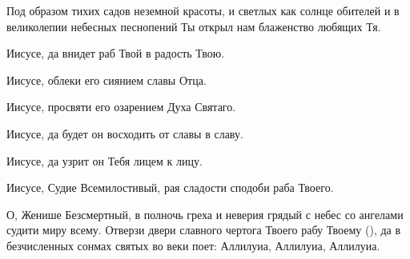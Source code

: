 \begin{mymulticols}

Под образом тихих садов неземной красоты, и светлых как солнце обителей и в великолепии небесных песнопений Ты открыл нам блаженство любящих Тя. 

Иисусе, да внидет раб Твой в радость Твою. 

Иисусе, облеки его сиянием славы Отца. 

Иисусе, просвяти его озарением Духа Святаго. 

Иисусе, да будет он восходить от славы в славу. 

Иисусе, да узрит он Тебя лицем к лицу. 

Иисусе, Судие Всемилостивый, рая сладости сподоби раба Твоего.


О, Женише Безсмертный, в полночь греха и неверия грядый с небес со ангелами судити миру всему. Отверзи двери славного чертога Твоего рабу Твоему (), да в безчисленных сонмах святых во веки поет: Аллилуиа, Аллилуиа, Аллилуиа. 


\akafistZaEdinIkosOne

\akafistZaEdinKondakOne

\end{mymulticols}

\mychapterending

